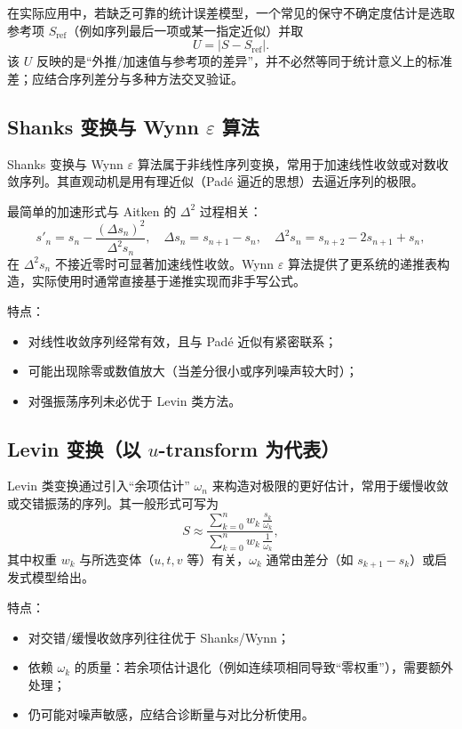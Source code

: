 \documentclass[UTF8,a4paper,11pt]{ctexart}
\begin{document}
在实际应用中，若缺乏可靠的统计误差模型，一个常见的保守不确定度估计是选取参考项 $S_{\mathrm{ref}}$（例如序列最后一项或某一指定近似）并取
\begin{equation}
U=|S-S_{\mathrm{ref}}|.
\end{equation}
该 $U$ 反映的是“外推/加速值与参考项的差异”，并不必然等同于统计意义上的标准差；应结合序列差分与多种方法交叉验证。

\subsection{Shanks 变换与 Wynn $\varepsilon$ 算法}

Shanks 变换与 Wynn $\varepsilon$ 算法属于非线性序列变换，常用于加速线性收敛或对数收敛序列。其直观动机是用有理近似（Pad\'e 逼近的思想）去逼近序列的极限。

最简单的加速形式与 Aitken 的 $\Delta^2$ 过程相关：
\begin{equation}
s'_n = s_n - \frac{(\Delta s_n)^2}{\Delta^2 s_n},\quad
\Delta s_n=s_{n+1}-s_n,\quad
\Delta^2 s_n=s_{n+2}-2s_{n+1}+s_n,
\end{equation}
在 $\Delta^2 s_n$ 不接近零时可显著加速线性收敛。Wynn $\varepsilon$ 算法提供了更系统的递推表构造，实际使用时通常直接基于递推实现而非手写公式。

特点：
\begin{itemize}
  \item 对线性收敛序列经常有效，且与 Pad\'e 近似有紧密联系；
  \item 可能出现除零或数值放大（当差分很小或序列噪声较大时）；
  \item 对强振荡序列未必优于 Levin 类方法。
\end{itemize}

\subsection{Levin 变换（以 $u$-transform 为代表）}

Levin 类变换通过引入“余项估计” $\omega_n$ 来构造对极限的更好估计，常用于缓慢收敛或交错振荡的序列。其一般形式可写为
\begin{equation}
S \approx \frac{\sum_{k=0}^{n} w_k\,\frac{s_k}{\omega_k}}{\sum_{k=0}^{n} w_k\,\frac{1}{\omega_k}},
\end{equation}
其中权重 $w_k$ 与所选变体（$u,t,v$ 等）有关，$\omega_k$ 通常由差分（如 $s_{k+1}-s_k$）或启发式模型给出。

特点：
\begin{itemize}
  \item 对交错/缓慢收敛序列往往优于 Shanks/Wynn；
  \item 依赖 $\omega_k$ 的质量：若余项估计退化（例如连续项相同导致“零权重”），需要额外处理；
  \item 仍可能对噪声敏感，应结合诊断量与对比分析使用。
\end{itemize}
\end{document}
